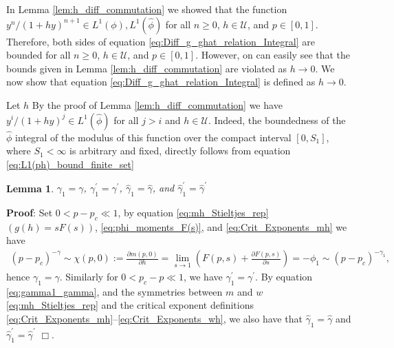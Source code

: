 \documentclass[jmp,graphicx]{revtex4-1}
\newtheorem{lemma}{Lemma}[section]
\newcommand{\ph}{\hat{\phi}}
\newcommand{\gh}{\hat{\gamma}}
\begin{document}
In Lemma \ref{lem:h_diff_commutation} we showed that the function
$y^n/(1+hy)^{n+1}\in L^1(\phi),L^1(\ph)$ for all $n\geq0$, $h\in\mathcal{U}$, and
$p\in[0,1]$. Therefore, both sides of equation
\eqref{eq:Diff_g_ghat_relation_Integral} are bounded for all
$n\geq0$, $h\in\mathcal{U}$, and $p\in[0,1]$. However, on can easily see that the
bounds given in Lemma \ref{lem:h_diff_commutation} are violated as
$h\to0$. We now show that equation
\eqref{eq:Diff_g_ghat_relation_Integral} is defined as $h\to0$.

Let $h$ By the proof of Lemma \ref{lem:h_diff_commutation} we have
$y^i/(1+hy)^j\in L^1(\ph)$ for all $j>i$ and $h\in\mathcal{U}$. Indeed, the
boundedness of the $\ph$ integral of the modulus of this function over
the compact interval $[0,S_1]$, where $S_1<\infty$ is arbitrary and fixed,
directly follows from equation
\eqref{eq:L1(ph)_bound_finite_set}  
%
\begin{lemma}\label{lem:nonzero_gamma1_etc}
  $\gamma_1=\gamma$, $\gamma_1^\prime=\gamma^\prime$, $\gh_1=\gh$, and $\gh_1^\prime=\gh^\prime$
\end{lemma}
%
\noindent \textbf{Proof}:
%
Set $0<p-p_c\ll1$, by equation \eqref{eq:mh_Stieltjes_rep}
$(g(h)=sF(s))$, \eqref{eq:phi_moments_F(s)}, and
\eqref{eq:Crit_Exponents_mh} we have    
%
\begin{align}\label{eq:gamma1_gamma}
  (p-p_c)^{-\gamma}\sim\chi(p,0)
          :=\frac{\partial m(p,0)}{\partial h}
          =\lim_{s\to1}\left(F(p,s)+\frac{\partial F(p,s)}{\partial s}\right)
          =-\phi_1\sim(p-p_c)^{-\gamma_1},
\end{align}
%
hence $\gamma_1=\gamma$. Similarly for $0<p_c-p\ll1$, we have $\gamma_1^\prime=\gamma^\prime$. By
equation \eqref{eq:gamma1_gamma}, and the symmetries between $m$ and
$w$ \eqref{eq:mh_Stieltjes_rep} and the critical exponent definitions 
\eqref{eq:Crit_Exponents_mh}--\eqref{eq:Crit_Exponents_wh}, we also
have that $\gh_1=\gh$ and $\gh_1^\prime=\gh^\prime$ $\Box$.   
\end{document}
